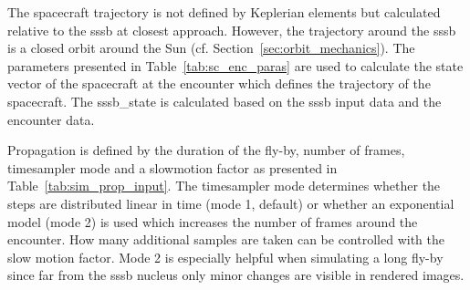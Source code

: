 The spacecraft trajectory is not defined by Keplerian elements but calculated relative to the \gls{sssb} at closest approach. However, the trajectory around the \gls{sssb} is a closed orbit around the Sun (cf. Section~\ref{sec:orbit_mechanics}). The parameters presented in Table~\ref{tab:sc_enc_paras} are used to calculate the state vector of the spacecraft at the encounter which defines the trajectory of the spacecraft. The sssb\_state is calculated based on the \gls{sssb} input data and the encounter data.

\begin{table}[htb]
    \centering
    \caption{Parameters that define the encounter state of the spacecraft in~\gls{sispo}. The first five parameters are required as input.}
    \label{tab:sc_enc_paras}
\end{table}

Propagation is defined by the duration of the fly-by, number of frames, timesampler mode and a slowmotion factor as presented in Table~\ref{tab:sim_prop_input}. The timesampler mode determines whether the steps are distributed linear in time (mode 1, default) or whether an exponential model (mode 2) is used which increases the number of frames around the encounter. How many additional samples are taken can be controlled with the slow motion factor. Mode 2 is especially helpful when simulating a long fly-by since far from the \gls{sssb} nucleus only minor changes are visible in rendered images.

